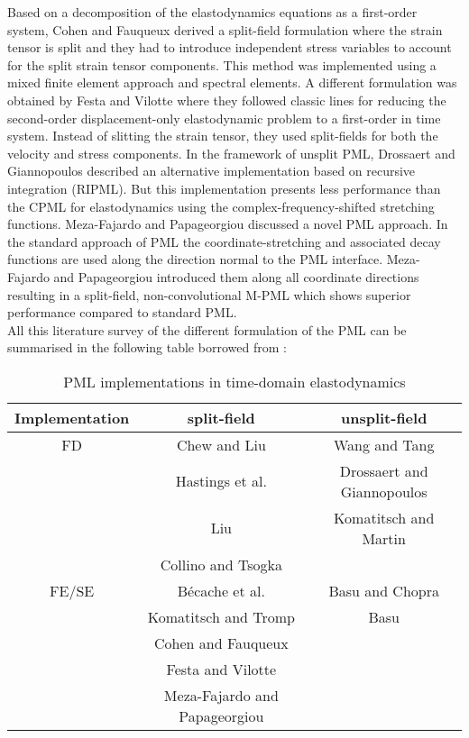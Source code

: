 Based on a decomposition of the elastodynamics equations as a first-order system, Cohen and Fauqueux \cite{Cohen} derived a split-field formulation where the strain tensor is split and they had to introduce independent stress variables to account for the split strain tensor components. This method was implemented using a mixed finite element approach and spectral elements. A different formulation was obtained by Festa and Vilotte \cite{Festa} where they followed classic lines for reducing the second-order displacement-only elastodynamic problem to a first-order in time system. Instead of slitting the strain tensor, they used split-fields for both the velocity and stress components. In the framework of unsplit PML, Drossaert and Giannopoulos \cite{Drossaert1} described an alternative implementation based on recursive integration (RIPML). But this implementation presents less performance than the CPML for elastodynamics using the complex-frequency-shifted stretching functions\cite{Drossaert2}. Meza-Fajardo and Papageorgiou \cite{Meza} discussed a novel PML approach. In the standard approach of PML the coordinate-stretching and associated decay functions are used along the direction normal to the PML interface. Meza-Fajardo and Papageorgiou introduced them along all coordinate directions resulting in a split-field, non-convolutional M-PML which shows superior performance compared to standard PML.  \\
All this literature survey of the different formulation of the PML can be summarised in the following table borrowed from \cite{Kucukcoban}:
\begin{table}[H]
    \centering
    \begin{tabular}{c|c|c}
        Implementation & split-field & unsplit-field \\
        \hline
        FD & Chew and Liu \cite{ChewLiu} & Wang and Tang \cite{Wang}\\
         & Hastings et al. \cite{Hastings} & Drossaert and Giannopoulos  \cite{Drossaert1, Drossaert2}\\
         &Liu\cite{Liu} & Komatitsch and Martin \cite{Komatitsch}\\
         &Collino and Tsogka \cite{Collino} & \\
         \hline
        FE/SE &  Bécache et al. \cite{Becache2} & Basu and Chopra \cite{Basu2003}\\
        & Komatitsch and Tromp \cite{Komatitsch}& Basu \cite{Basu2004}\\
        & Cohen and Fauqueux  \cite{Cohen} & \\
        & Festa and Vilotte \cite{Festa} & \\
        & Meza-Fajardo and Papageorgiou \cite{Meza} & 
    \end{tabular}
    \caption{PML implementations in time-domain elastodynamics}
    \label{tab:litterature}
\end{table}

